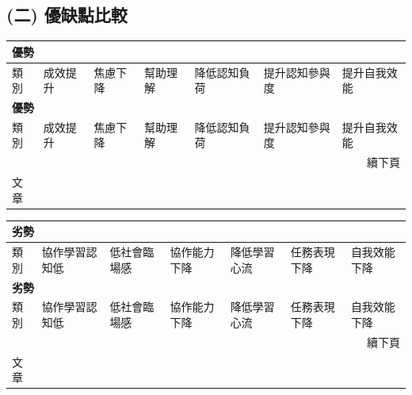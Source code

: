 \subsection{(二) 優缺點比較}\label{sec:優缺點比較}

\begin{longtable}{p{} p{} p{} p{} p{} p{} p{}}
\toprule
\multicolumn{7}{l}{\textbf{優勢}} \\
\midrule
類別 & 成效提升 & 焦慮下降 & 幫助理解 & 降低認知負荷 & 提升認知參與度 & 提升自我效能 \\
\midrule
\endfirsthead
\toprule
\multicolumn{7}{l}{\textbf{優勢}} \\
\midrule
類別 & 成效提升 & 焦慮下降 & 幫助理解 & 降低認知負荷 & 提升認知參與度 & 提升自我效能 \\
\midrule
\endhead
\midrule
\multicolumn{7}{r}{續下頁} \\
\endfoot
\bottomrule
\endlastfoot
文章 & \cite{fan2025pair,groothuijsen2024chatbots,llerena2024introductory,omeh2025pbl,kohen2025integrating,tang2025enhancing} & \cite{fan2025pair} & \cite{cao2023chatbots,groothuijsen2024chatbots,llerena2024introductory,tang2025enhancing} & \cite{yan2025llm} & \cite{cao2023chatbots,kohen2025integrating} & \cite{yan2025llm,tang2025enhancing,cubillos2025generative} \\
\end{longtable}

\begin{longtable}{p{} p{} p{} p{} p{} p{} p{}}
\toprule
\multicolumn{7}{l}{\textbf{劣勢}} \\
\midrule
類別 & 協作學習認知低 & 低社會臨場感 & 協作能力下降 & 降低學習心流 & 任務表現下降 & 自我效能下降 \\
\midrule
\endfirsthead
\toprule
\multicolumn{7}{l}{\textbf{劣勢}} \\
\midrule
類別 & 協作學習認知低 & 低社會臨場感 & 協作能力下降 & 降低學習心流 & 任務表現下降 & 自我效能下降 \\
\midrule
\endhead
\midrule
\multicolumn{7}{r}{續下頁} \\
\endfoot
\bottomrule
\endlastfoot
文章 & \cite{fan2025pair,groothuijsen2024chatbots} & \cite{fan2025pair} & \cite{groothuijsen2024chatbots} & \cite{yang2025chatgpt} & \cite{kohen2025integrating} & \cite{yang2025chatgpt} \\
\end{longtable}

